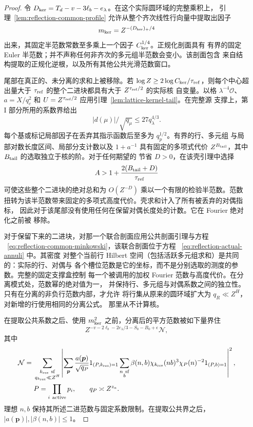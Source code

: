 \begin{proof}
令 \(D_{\rm ker}=T_d-v-3\ell_b-e_\lambda\)。在这个实际圆环域的完整乘积上，
引理~\ref{lem:reflection-common-profile} 允许从整个齐次线性行向量中提取出因子
\[
 m_{\rm ker}=Z^{-(D_{\rm ker})_+/4}
\]
出来，其固定半范数常数至多乘上一个因子 \(C_{\rm ker}^{1/4}\)。正规化剖面具有
有界的固定 Euler 半范数；并不声称任何非齐次的多元组半范数会变小。该剖面包含
来自结构提取的正规化逆根，以及所有其他公共光滑范数窗口。

尾部在真正的、未分离的求和上被移除。若
\(\log Z\ge2\log C_{\rm ker}/\tau_{\rm ref}\)，则每个中心超出量大于
\(\tau_{\rm ref}\) 的整个二进块都具有大于 \(Z^{\tau_{\rm ref}/2}\) 的实际核
自变量。以格 \(\lambda^{-4}\mathcal O\)、\(a=X/q_c^2\) 和
\(U=Z^{\tau_{\rm ref}/2}\) 应用引理~\ref{lem:lattice-kernel-tail}。在完整源
支撑上，第 I 部分所用的系数界给出
\[
 |d(\mu)|/\sqrt{q_\mu}\le27q_\lambda^{4/3}.
\]
每个基或标记局部因子在丢弃其指示函数后至多为 \(q_p^{1/2}\)。有界的行、多元组
与局部对数长度区间、局部分支计数以及 \(1+a^{-1}\) 具有固定的多项式代价
\(Z^{B_{\rm tail}}\)，其中 \(B_{\rm tail}\) 的选取独立于核的阶。对于任何期望的
节省 \(D>0\)，在该壳引理中选择
\[
 A>1+\frac{2(B_{\rm tail}+D)}{\tau_{\rm ref}}
\]
可使这些整个二进块的绝对总和为 \(O(Z^{-D})\) 乘以一个有限的检验半范数。范数
扭转为该半范数带来固定的多项式高度代价。壳求和计入了所有被丢弃的对偶指标，
因此对于该尾部没有使用任何在保留对偶长度处的计数。它在 Fourier 绝对化之前被
移除。

对于保留下来的二进块，对那一个联合剖面应用公共剖面引理与方程
~\eqref{eq:reflection-common-minkowski}，该联合剖面位于方程
~\eqref{eq:reflection-actual-annuli} 中。其密度
对整个当前行 Hilbert 空间（包括活跃多元组求和）是共同的：实际的行、对偶与
各个槽位范数是它的坐标，而不是分别选取的测度的参数。完整的固定支撑盒控制
每一个被调用的加权 Fourier 范数与高度代价。在分离模式处，范数幂的绝对值为一，
并保持行、多元组与对偶系数之间的独立性。只有在分离的非负行范数内部，才允许
将行集从原来的圆环域扩大为 \(q_R\ll Z^H\)，对新增的行使用相同的分离公式。
那里从不计算核。

在提取公共系数之后、使用 \(m_{\rm ker}^2\) 之前，分离后的平方范数被如下量界住
\[
 Z^{-v-2\ell_b-2e_\lambda/3-S_0-B_0+\epsilon}\mathcal N,
\]
其中
\begin{equation}\label{old-eq:4.6a}
 \begin{split}
 \mathcal N={}&
 \sum_{\substack{k_{\rm res}\ {\rm sf}\\q_{k_{\rm res}}\ll Z^H}}
 \left|
 \sum_{\boldsymbol p}
 \frac{a(\boldsymbol p)}{\sqrt{q_P}}1_{(P,k_{\rm res})=1}
 \sum_{\substack{n\ {\rm sf}\\b}}
 \beta(n,b)\chi_{k_{\rm res}}(nb)^3
              \chi_P(n)^{-2}1_{(P,b)=1}
 \right|^2,\\
 &P=\prod_{i\ {\rm active}}p_i,\qquad q_P\asymp Z^{z_a}.
 \end{split}
\end{equation}
理想 \(n,b\) 保持其所述二进范数与固定系数限制。在提取公共界之后，
\(|a(\boldsymbol p)|,|\beta(n,b)|\le1\)。


\end{proof}
